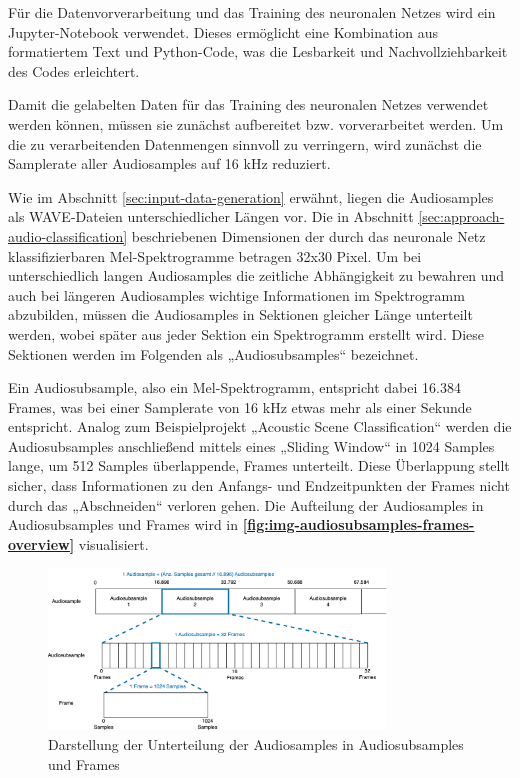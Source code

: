 Für die Datenvorverarbeitung und das Training des neuronalen Netzes wird ein Jupyter-Notebook verwendet. Dieses ermöglicht eine Kombination aus formatiertem Text und Python-Code, was die Lesbarkeit und Nachvollziehbarkeit des Codes erleichtert.

Damit die gelabelten Daten für das Training des neuronalen Netzes verwendet werden können, müssen sie zunächst aufbereitet bzw. vorverarbeitet werden. Um die zu verarbeitenden Datenmengen sinnvoll zu verringern, wird zunächst die Samplerate aller Audiosamples auf 16 kHz reduziert.

Wie im Abschnitt \ref{sec:input-data-generation} erwähnt, liegen die Audiosamples als WAVE-Dateien unterschiedlicher Längen vor. Die in Abschnitt \ref{sec:approach-audio-classification} beschriebenen Dimensionen der durch das neuronale Netz klassifizierbaren Mel-Spektrogramme betragen 32x30 Pixel. Um bei unterschiedlich langen Audiosamples die zeitliche Abhängigkeit zu bewahren und auch bei längeren Audiosamples wichtige Informationen im Spektrogramm abzubilden, müssen die Audiosamples in Sektionen gleicher Länge unterteilt werden, wobei später aus jeder Sektion ein Spektrogramm erstellt wird. Diese Sektionen werden im Folgenden als „Audiosubsamples“ bezeichnet.

Ein Audiosubsample, also ein Mel-Spektrogramm, entspricht dabei 16.384 Frames, was bei einer Samplerate von 16 kHz etwas mehr als einer Sekunde entspricht. Analog zum Beispielprojekt „Acoustic Scene Classification“ \cite{stm-asc}\cite{stm-asc-2} werden die Audiosubsamples anschließend mittels eines „Sliding Window“ in 1024 Samples lange, um 512 Samples überlappende, Frames unterteilt. Diese Überlappung stellt sicher, dass Informationen zu den Anfangs- und Endzeitpunkten der Frames nicht durch das „Abschneiden“ verloren gehen. Die Aufteilung der Audiosamples in Audiosubsamples und Frames wird in \textbf{\autoref{fig:img-audiosubsamples-frames-overview} }visualisiert.

\begin{figure}[h!]
\centering
\includegraphics[width=0.8\textwidth]{images/08_durchfuehrung/audiosubsamples_frames_overview.png}
\caption{Darstellung der Unterteilung der Audiosamples in Audiosubsamples und Frames}
\label{fig:img-audiosubsamples-frames-overview}
\end{figure}

